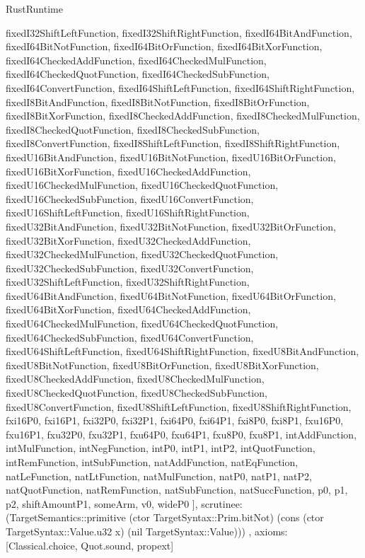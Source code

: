 \begin{lexlean}{RustRuntime}
\begin{semanticmodule}
{{      fixedI32ShiftLeftFunction,
      fixedI32ShiftRightFunction,
      fixedI64BitAndFunction,
      fixedI64BitNotFunction,
      fixedI64BitOrFunction,
      fixedI64BitXorFunction,
      fixedI64CheckedAddFunction,
      fixedI64CheckedMulFunction,
      fixedI64CheckedQuotFunction,
      fixedI64CheckedSubFunction,
      fixedI64ConvertFunction,
      fixedI64ShiftLeftFunction,
      fixedI64ShiftRightFunction,
      fixedI8BitAndFunction,
      fixedI8BitNotFunction,
      fixedI8BitOrFunction,
      fixedI8BitXorFunction,
      fixedI8CheckedAddFunction,
      fixedI8CheckedMulFunction,
      fixedI8CheckedQuotFunction,
      fixedI8CheckedSubFunction,
      fixedI8ConvertFunction,
      fixedI8ShiftLeftFunction,
      fixedI8ShiftRightFunction,
      fixedU16BitAndFunction,
      fixedU16BitNotFunction,
      fixedU16BitOrFunction,
      fixedU16BitXorFunction,
      fixedU16CheckedAddFunction,
      fixedU16CheckedMulFunction,
      fixedU16CheckedQuotFunction,
      fixedU16CheckedSubFunction,
      fixedU16ConvertFunction,
      fixedU16ShiftLeftFunction,
      fixedU16ShiftRightFunction,
      fixedU32BitAndFunction,
      fixedU32BitNotFunction,
      fixedU32BitOrFunction,
      fixedU32BitXorFunction,
      fixedU32CheckedAddFunction,
      fixedU32CheckedMulFunction,
      fixedU32CheckedQuotFunction,
      fixedU32CheckedSubFunction,
      fixedU32ConvertFunction,
      fixedU32ShiftLeftFunction,
      fixedU32ShiftRightFunction,
      fixedU64BitAndFunction,
      fixedU64BitNotFunction,
      fixedU64BitOrFunction,
      fixedU64BitXorFunction,
      fixedU64CheckedAddFunction,
      fixedU64CheckedMulFunction,
      fixedU64CheckedQuotFunction,
      fixedU64CheckedSubFunction,
      fixedU64ConvertFunction,
      fixedU64ShiftLeftFunction,
      fixedU64ShiftRightFunction,
      fixedU8BitAndFunction,
      fixedU8BitNotFunction,
      fixedU8BitOrFunction,
      fixedU8BitXorFunction,
      fixedU8CheckedAddFunction,
      fixedU8CheckedMulFunction,
      fixedU8CheckedQuotFunction,
      fixedU8CheckedSubFunction,
      fixedU8ConvertFunction,
      fixedU8ShiftLeftFunction,
      fixedU8ShiftRightFunction,
      fxi16P0,
      fxi16P1,
      fxi32P0,
      fxi32P1,
      fxi64P0,
      fxi64P1,
      fxi8P0,
      fxi8P1,
      fxu16P0,
      fxu16P1,
      fxu32P0,
      fxu32P1,
      fxu64P0,
      fxu64P1,
      fxu8P0,
      fxu8P1,
      intAddFunction,
      intMulFunction,
      intNegFunction,
      intP0,
      intP1,
      intP2,
      intQuotFunction,
      intRemFunction,
      intSubFunction,
      natAddFunction,
      natEqFunction,
      natLeFunction,
      natLtFunction,
      natMulFunction,
      natP0,
      natP1,
      natP2,
      natQuotFunction,
      natRemFunction,
      natSubFunction,
      natSuccFunction,
      p0,
      p1,
      p2,
      shiftAmountP1,
      someArm,
      v0,
      wideP0
    ],
    scrutinee: (TargetSemantics::primitive (ctor TargetSyntax::Prim.bitNot) (cons (ctor TargetSyntax::Value.u32 x) (nil TargetSyntax::Value)))
  },
  axioms: [Classical.choice, Quot.sound, propext]
}


\end{semanticmodule}
\end{lexlean}
